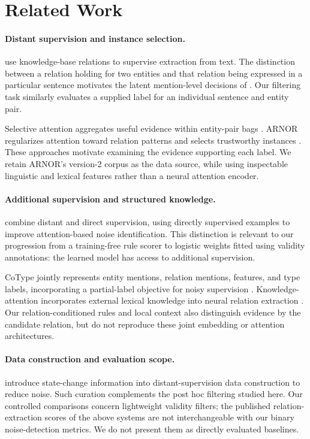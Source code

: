 \documentclass[11pt]{article}
\begin{document}
\section{Related Work}
\paragraph{Distant supervision and instance selection.}
\citet{mintz-etal-2009-distant} use knowledge-base relations to supervise extraction from text. The distinction between a relation holding for two entities and that relation being expressed in a particular sentence motivates the latent mention-level decisions of \citet{riedel2010modeling}. Our filtering task similarly evaluates a supplied label for an individual sentence and entity pair.

Selective attention aggregates useful evidence within entity-pair bags \citep{lin-etal-2016-neural}. ARNOR regularizes attention toward relation patterns and selects trustworthy instances \citep{jia-etal-2019-arnor}. These approaches motivate examining the evidence supporting each label. We retain ARNOR's version-2 corpus as the data source, while using inspectable linguistic and lexical features rather than a neural attention encoder.

\paragraph{Additional supervision and structured knowledge.}
\citet{beltagy-etal-2019-combining} combine distant and direct supervision, using directly supervised examples to improve attention-based noise identification. This distinction is relevant to our progression from a training-free rule scorer to logistic weights fitted using validity annotations: the learned model has access to additional supervision.

CoType jointly represents entity mentions, relation mentions, features, and type labels, incorporating a partial-label objective for noisy supervision \citep{ren2017cotype}. Knowledge-attention incorporates external lexical knowledge into neural relation extraction \citep{li-etal-2019-improving}. Our relation-conditioned rules and local context also distinguish evidence by the candidate relation, but do not reproduce these joint embedding or attention architectures.

\paragraph{Data construction and evaluation scope.}
\citet{shah-etal-2022-enhanced} introduce state-change information into distant-supervision data construction to reduce noise. Such curation complements the post hoc filtering studied here. Our controlled comparisons concern lightweight validity filters; the published relation-extraction scores of the above systems are not interchangeable with our binary noise-detection metrics. We do not present them as directly evaluated baselines.
\end{document}
